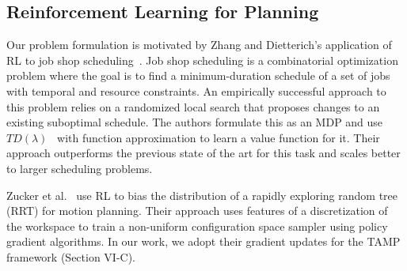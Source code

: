 \subsection{Reinforcement Learning for Planning}
Our problem formulation is motivated by Zhang and Dietterich's application of RL to job
shop scheduling~\cite{JobShopSched}. Job shop scheduling is a combinatorial optimization problem where the goal is to find
a minimum-duration schedule of a set of jobs with temporal and resource constraints. An empirically
successful approach to this problem relies on a randomized local search that proposes changes to an
existing suboptimal schedule. The authors formulate this as an MDP and use $TD(\lambda)$~\cite{suttonbarto} with function
approximation to learn a value function for it. Their approach outperforms the previous state of the art for this task and
scales better to larger scheduling problems.

Zucker et al.~\cite{workspacebias} use RL to bias the distribution of a rapidly exploring random tree (RRT)
for motion planning. Their approach uses features of a discretization of the workspace to train
a non-uniform configuration space sampler using policy gradient algorithms.
In our work, we adopt their gradient updates for the TAMP framework (Section VI-C).